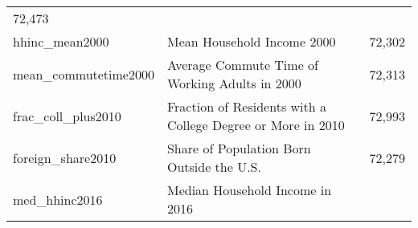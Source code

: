 \documentclass[]{book}
\begin{document}
\begin{longtable}[]{@{}lll@{}}
\begin{minipage}[t]{0.04\columnwidth}
72,473\strut
\end{minipage}\tabularnewline
\begin{minipage}[t]{0.04\columnwidth}\raggedright\strut
hhinc\_mean2000\strut
\end{minipage} & \begin{minipage}[t]{0.04\columnwidth}\raggedright\strut
Mean Household Income 2000\strut
\end{minipage} & \begin{minipage}[t]{0.04\columnwidth}\raggedright\strut
72,302\strut
\end{minipage}\tabularnewline
\begin{minipage}[t]{0.04\columnwidth}\raggedright\strut
mean\_commutetime2000\strut
\end{minipage} & \begin{minipage}[t]{0.04\columnwidth}\raggedright\strut
Average Commute Time of Working Adults in 2000\strut
\end{minipage} & \begin{minipage}[t]{0.04\columnwidth}\raggedright\strut
72,313\strut
\end{minipage}\tabularnewline
\begin{minipage}[t]{0.04\columnwidth}\raggedright\strut
frac\_coll\_plus2010\strut
\end{minipage} & \begin{minipage}[t]{0.04\columnwidth}\raggedright\strut
Fraction of Residents with a College Degree or More in 2010\strut
\end{minipage} & \begin{minipage}[t]{0.04\columnwidth}\raggedright\strut
72,993\strut
\end{minipage}\tabularnewline
\begin{minipage}[t]{0.04\columnwidth}\raggedright\strut
foreign\_share2010\strut
\end{minipage} & \begin{minipage}[t]{0.04\columnwidth}\raggedright\strut
Share of Population Born Outside the U.S.\strut
\end{minipage} & \begin{minipage}[t]{0.04\columnwidth}\raggedright\strut
72,279\strut
\end{minipage}\tabularnewline
\begin{minipage}[t]{0.04\columnwidth}\raggedright\strut
med\_hhinc2016\strut
\end{minipage} & \begin{minipage}[t]{0.04\columnwidth}\raggedright\strut
Median Household Income in 2016\strut

\end{minipage}
\end{longtable}
\end{document}
